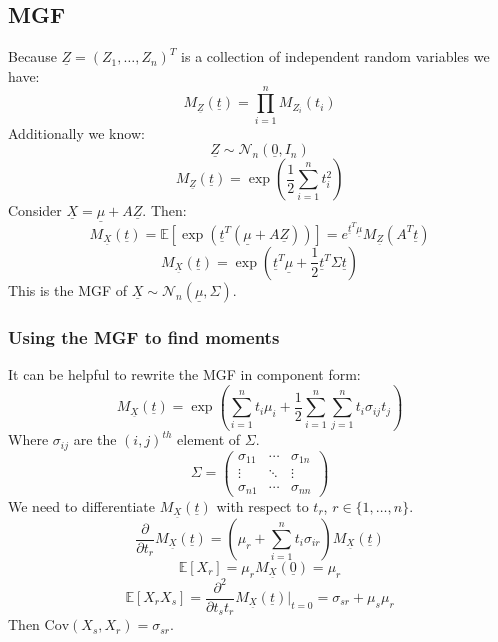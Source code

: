 \documentclass[12pt]{article}
\newcommand{\pf}[2]{\frac{\partial #1}{\partial #2}}
\begin{document}
\subsection{MGF}
Because \(\underline{Z}=(Z_1,\dots,Z_n)^T\) is a collection of independent random variables we have:
\[M_{\underline{Z}}(\underline{t})=\prod^n_{i=1}M_{Z_i}(t_i)\]
Additionally we know:
\[\underline{Z}\sim \mathcal{N}_n(\underline{0}, I_n)\]
\[M_{\underline{Z}}(\underline{t})=\exp \left(\frac{1}{2}\sum^n_{i=1}t_i^2\right)\]
Consider \(\underline{X}=\underline{\mu}+A\underline{Z}\). Then:
\[M_{\underline{X}}(\underline{t})=\mathbb{E}[\exp(\underline{t}^T(\underline{\mu}+A\underline{Z}))]=e^{\underline{t}^T\underline{\mu}}M_{\underline{Z}}(A^T\underline{t})\]
\[M_{\underline{X}}(\underline{t})=\exp\left(\underline{t}^T\underline{\mu}+\frac{1}2{\underline{t}^T\Sigma\underline{t}}\right)\]
This is the MGF of \(\underline{X}\sim\mathcal{N}_n(\underline{\mu},\Sigma)\).
\subsubsection{Using the MGF to find moments}
It can be helpful to rewrite the MGF in component form:
\[M_{\underline{X}}(\underline{t})=\exp\left(\sum^n_{i=1}t_i\mu_i+\frac{1}{2}\sum^n_{i=1}\sum^n_{j=1}t_i\sigma_{ij}t_j\right)\]
Where \(\sigma_{ij}\) are the \((i,j)^{th}\) element of \(\Sigma\).
\[\Sigma=\begin{pmatrix}
    \sigma_{11}&\cdots&\sigma_{1n} \\
    \vdots & \ddots & \vdots \\
    \sigma_{n1} & \cdots & \sigma_{nn}
\end{pmatrix}\]
We need to differentiate \(M_{\underline{X}}(\underline{t})\) with respect to \(t_r\), \(r\in\{1,\dots,n\}\).
\[\pf{}{t_r}M_{\underline{X}}(\underline{t})=(\mu_r+\sum^n_{i=1}t_i\sigma_{ir})M_{\underline{X}}(\underline{t})\]
\[\mathbb{E}[X_r]=\mu_rM_{\underline{X}}(\underline{0})=\mu_r\]
\[\mathbb{E}[X_rX_s]=\pf{^2}{t_st_r}M_{\underline{X}}(\underline{t})\bigr|_{t=0}=\sigma_{sr}+\mu_s\mu_r\]
Then \(\text{Cov}(X_s,X_r)=\sigma_{sr}\).
\end{document}
